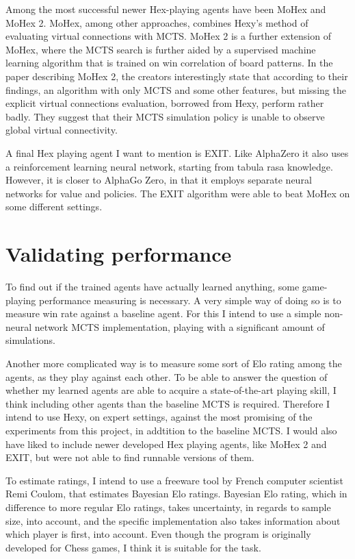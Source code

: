 Among the most successful newer Hex-playing agents have been MoHex and MoHex 2. MoHex, among other approaches, combines Hexy's method of evaluating virtual connections with MCTS. MoHex 2 is a further extension of MoHex, where the MCTS search is further aided by  a supervised machine learning algorithm that is trained on win correlation of board patterns. In the paper describing MoHex 2, the creators interestingly state that according to their findings, an algorithm with only MCTS and some other features, but missing the explicit virtual connections evaluation, borrowed from Hexy, perform rather badly. They suggest that their MCTS simulation policy is unable to observe global virtual connectivity\cite{Huang2014}.

A final Hex playing agent I want to mention is EXIT\cite{AnthonyThomasandTianZhengandBarber2017}. Like AlphaZero it also uses a reinforcement learning neural network, starting from tabula rasa knowledge. However, it is closer to AlphaGo Zero, in that it employs separate neural networks for value and policies. The EXIT algorithm were able to beat MoHex on some different settings\citep{AnthonyThomasandTianZhengandBarber2017}.

\section{Validating performance}
To find out if the trained agents have actually learned anything, some game-playing performance measuring is necessary. A very simple way of doing so is to measure win rate against a baseline agent. For this I intend to use a simple non-neural network MCTS implementation, playing with a significant amount of simulations.

Another more complicated way is to measure some sort of Elo rating among the agents, as they play against each other. To be able to answer the question of whether my learned agents are able to acquire a state-of-the-art playing skill, I think including other agents than the baseline MCTS is required. Therefore I intend to use Hexy, on expert settings, against the most promising of the experiments from this project, in addtition to the baseline MCTS. I would also have liked to include newer developed Hex playing agents, like MoHex 2 and EXIT, but were not able to find runnable versions of them.

To estimate ratings, I intend to use a freeware tool by French computer scientist Remi Coulom, that estimates Bayesian Elo ratings\cite{Coulom}. Bayesian Elo rating, which in difference to more regular Elo ratings, takes uncertainty, in regards to sample size, into account, and the specific implementation also takes information about which player is first, into account. Even though the program is originally developed for Chess games, I think it is suitable for the task.

